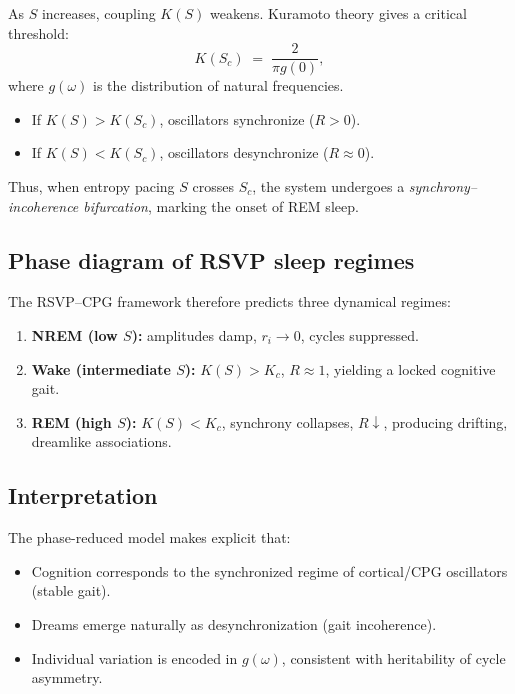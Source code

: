 \documentclass{article}
\begin{document}
As $S$ increases, coupling $K(S)$ weakens.  
Kuramoto theory gives a critical threshold:
\begin{equation}
K(S_c) \;=\; \frac{2}{\pi g(0)},
\end{equation}
where $g(\omega)$ is the distribution of natural frequencies.  

\begin{itemize}
\item If $K(S) > K(S_c)$, oscillators synchronize ($R>0$).
\item If $K(S) < K(S_c)$, oscillators desynchronize ($R \approx 0$).
\end{itemize}

Thus, when entropy pacing $S$ crosses $S_c$, the system undergoes a
\emph{synchrony--incoherence bifurcation}, marking the onset of REM sleep.

\subsection{Phase diagram of RSVP sleep regimes}

The RSVP--CPG framework therefore predicts three dynamical regimes:
\begin{enumerate}
\item \textbf{NREM (low $S$):} amplitudes damp, $r_i \to 0$, cycles suppressed.
\item \textbf{Wake (intermediate $S$):} $K(S) > K_c$, $R\approx 1$,
yielding a locked cognitive gait.
\item \textbf{REM (high $S$):} $K(S) < K_c$, synchrony collapses,
$R \downarrow$, producing drifting, dreamlike associations.
\end{enumerate}

\subsection{Interpretation}

The phase-reduced model makes explicit that:
\begin{itemize}
\item Cognition corresponds to the synchronized regime of cortical/CPG
oscillators (stable gait).
\item Dreams emerge naturally as desynchronization (gait incoherence).
\item Individual variation is encoded in $g(\omega)$, consistent with
heritability of cycle asymmetry.
\end{itemize}
\end{document}
